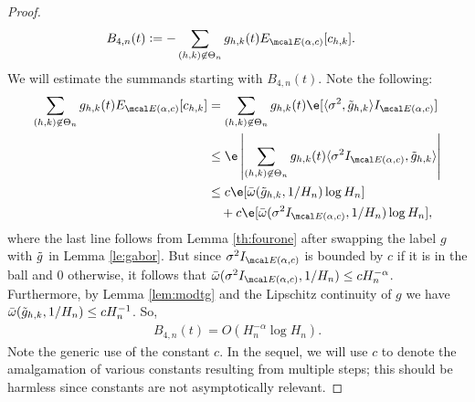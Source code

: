 \begin{appendices}
\begin{proof}
\begin{align}
  &B_{4,n}(t) := - \sum_{\substack{(h,k) \not\in \Theta_n }}g_{h,k}(t)\eind[\chk]. 
  \label{}
\end{align}
We will estimate the summands starting with $B_{4,n}(t)$. Note the following:
\begin{align}
  \sum_{\substack{(h,k) \not\in \Theta_n }}g_{h,k}(t)\eind[\chk] &=  \sum_{\substack{(h,k) \not\in \Theta_n }}g_{h,k}(t)\e[\inner{\sigma^2}{ \tghk}\indvol] \notag\\ 
&\le  \e\left\vert\sum_{\substack{(h,k) \not\in \Theta_n }}g_{h,k}(t)\inner{\sigma^2 \indvol}{ \tghk}\right\vert \notag\\
&\le c\e[\modc{\tghk}{1/H_n}\log H_n] \notag \\
&\quad + c\e[\modc{\sigma^2\indvol}{1/H_n} \log H_n]\notag,
\end{align}
where the last  line follows from Lemma \ref{th:fourone} after swapping the label $g$ with $\tilde{g}$ in Lemma \ref{le:gabor}. But since  $\sigma^2 \indvol$ is bounded by $c$ if it is in the \holder ball   and $0$ otherwise, it follows that $\modc{\sigma^2\indvol}{1/H_n} \le c H_n^{-\alpha}$. Furthermore, by Lemma \eqref{lem:modtg} and the Lipschitz continuity of $g$ we have ${\bar{\omega}}({\tilde{g}_{h,k}},1/H_n) \le c H^{-1}_n$.  So,  
\begin{align}
 B_{4,n}(t) =  O( H_n^{-\alpha}\log H_n).
  \label{eq:B4}
\end{align}
Note the generic use of the constant  $c$. In the sequel, we will use $c$ to denote the amalgamation of various constants resulting from multiple steps; this should be harmless since  constants are not asymptotically relevant. 


\end{proof}
\end{appendices}
